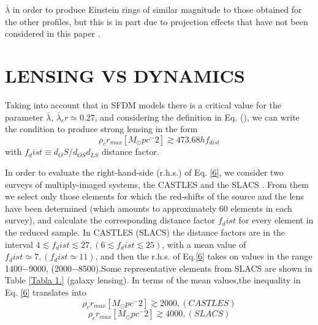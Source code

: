 \documentclass[15pt]{IEEEtran}
\begin{document}
 \noindent
 \(\bar{\lambda}\) in order to produce Einstein rings of similar magnitude to those obtained for the other profiles, but this is in part due to projection effects that have not been considered in this paper \cite{13}\cite{18}.
 
 \section{\textbf{LENSING VS DYNAMICS}}

Taking into account that in SFDM models there is a critical value for the parameter \(\bar{\lambda}\), \(\bar{\lambda}_cr\simeq 0.27\), and considering the definition in Eq. (), we can write the condition to produce strong lensing in the form
\begin{equation}\tag{6}\label{6}
    \rho_c r_{max}[M_\odot pc^-2] \gtrsim 473.68hf_{dist}
\end{equation}
with \(f_dist \equiv d_OS/d_{OS}d_{LS}\) distance factor.
\par
In  order  to  evaluate  the  right-hand-side  (r.h.s.)  of Eq. \eqref{6}, we consider two surveys of multiply-imaged systems,  the  CASTLES   and  the  SLACS .   From them  we  select  only  those  elements  for  which  the  red-shifts  of  the  source  and  the  lens  have  been  determined (which  amounts  to  approximately  60  elements  in  each survey),  and  calculate  the  corresponding  distance  factor \(f_dist\) for  every  element  in  the  reduced  sample.   In CASTLES (SLACS) the distance factors are in the interval \(4 \lesssim f_dist \lesssim 27, (6 \lesssim f_dist \lesssim 25)\), with a mean value of \(f_dist \simeq 7, (f_dist \simeq 11)\), and then the r.h.s.  of Eq.\eqref{6} takes on values in the range 1400−9000, (2000−8500).Some representative elements from SLACS are shown in Table \eqref{Tabla 1.}  (galaxy  lensing).   In  terms  of  the  mean  values,the inequality in Eq. \eqref{6} translates into
\begin{equation}\tag{7a}\label{7}
    \rho_c r_{max}[M_\odot pc^-2] \gtrsim 2000, (CASTLES)
\end{equation}
\begin{equation}\tag{7b}\label{7b}
    \rho_c r_{max}[M_\odot pc^-2] \gtrsim 4000, (SLACS) 
\end{equation}
\end{document}
